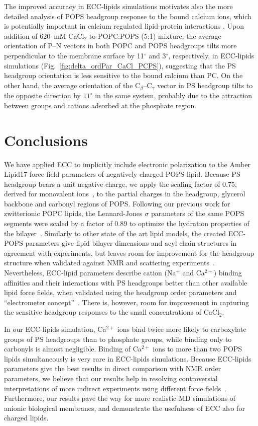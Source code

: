 \documentclass[journal=jctcce,manuscript=article]{achemso}
\begin{document}
The improved accuracy in ECC-lipids simulations motivates also the more detailed analysis of
POPS headgroup response to the bound calcium ions, which is potentially important in calcium regulated
lipid-protein interactions \cite{leventis10}.
Upon addition of 620~mM CaCl$_2$ to POPC:POPS (5:1) mixture,
the average orientation of P--N vectors in both POPC and POPS headgroups tilts more perpendicular to the membrane surface
by 11$^\circ$ and  3$^\circ$, respectively, in ECC-lipids simulations (Fig.~\ref{fig:delta_ordPar_CaCl_PCPS}),
suggesting that the PS headgroup orientation is less sensitive to the bound calcium than PC.
On the other hand, the average orientation of the C$_{\beta}$--C$_{\gamma}$ vector in PS headgroup
tilts to the opposite direction by $11^\circ$ in the same system, probably
due to the attraction between  groups and cations adsorbed at the phosphate region.



\section{Conclusions} 
We have applied ECC to implicitly include electronic polarization to the Amber Lipid17 force field
parameters of negatively charged POPS lipid.
Because PS headgroup bears a unit negative charge, we apply the scaling factor of 0.75,
derived for monovalent ions~\cite{leontyev09}, to the partial charges
in the headgroup, glycerol backbone and carbonyl regions of POPS.
Following our previous work for zwitterionic POPC lipids, the 
Lennard-Jones $\sigma$ parameters of the same POPS segments were
scaled by a factor of 0.89 to optimize the hydration properties of the bilayer~\cite{melcr18}.
Similarly to other state of the art lipid models, the created ECC-POPS parameters give
lipid bilayer dimensions and acyl chain structures in agreement with experiments,
but leaves room for improvement for the headgroup structure when validated against
NMR and scattering experiments~\cite{botan15,ollila16}.
Nevertheless, ECC-lipid parameters describe cation (Na$^+$ and Ca$^{2+}$) binding affinities
and their interactions with PS headgroups better than other available lipid force fields,
when validated using the headgroup order parameters and ``electrometer concept''~\cite{NMRlipidsIV}.
There is, however, room for improvement in capturing the sensitive headgroup responses to the
small concentrations of CaCl$_2$.

In our ECC-lipids simulation, Ca$^{2+}$ ions bind twice more likely to carboxylate groups
of PS headgroups than to phosphate groups, while binding only to carbonyls is almost negligible.
Binding of Ca$^{2+}$ ions to more than two POPS lipids simultaneously is very rare in \mbox{ECC-lipids} simulations.
Because \mbox{ECC-lipids} parameters give the best results in direct comparison with NMR order parameters, 
we believe that our results help in resolving controversial interpretations of more indirect experiments
using different force fields~\cite{melcrova16,valentine18,hallock18}.
Furthermore, our results pave the way for more realistic MD simulations of anionic biological membranes,
and demonstrate the usefulness of ECC also for charged lipids.
\end{document}
